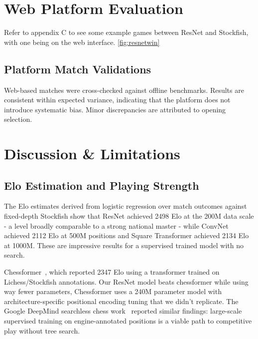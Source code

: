 \section{Web Platform Evaluation}

Refer to appendix C to see some example games between ResNet and Stockfish, with one being on the web interface. \ref{fig:resnetwin}


\subsection{Platform Match Validations}
Web-based matches were cross-checked against offline benchmarks. Results are consistent within expected variance, indicating that the platform does not introduce systematic bias. Minor discrepancies are attributed to opening selection.

\section{Discussion \& Limitations}

\subsection{Elo Estimation and Playing Strength}

The Elo estimates derived from logistic regression over match outcomes against fixed-depth Stockfish show that ResNet achieved 2498 Elo at the 200M data scale - a level broadly comparable to a strong national master - while ConvNet achieved 2112 Elo at 500M positions and Square Transformer achieved 2134 Elo at 1000M. These are impressive results for a supervised trained model with no search.

Chessformer~\cite{chessformer}, which reported 2347 Elo using a transformer trained on Lichess/Stockfish annotations. Our ResNet model beats chessformer while using way fewer parameters, Chessformer uses a 240M parameter model with architecture-specific positional encoding tuning that we didn't replicate. The Google DeepMind searchless chess work~\cite{searchless_chess} reported similar findings: large-scale supervised training on engine-annotated positions is a viable path to competitive play without tree search.

